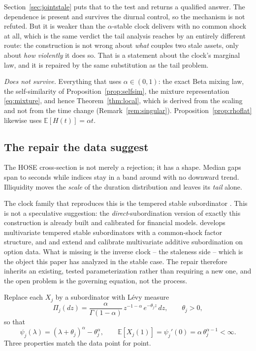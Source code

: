 \documentclass{ws-ijtaf}
\newcommand{\E}{\mathbb{E}}
\begin{document}
Section~\ref{sec:jointstale} puts that to the test and returns a qualified
answer. The dependence is present and survives the diurnal control, so the
mechanism is not refuted. But it is weaker than the $\alpha$-stable clock
delivers with no common shock at all, which is the same verdict the tail
analysis reaches by an entirely different route: the construction is not wrong
about \emph{what} couples two stale assets, only about \emph{how violently} it
does so. That is a statement about the clock's marginal law, and it is repaired
by the same substitution as the tail problem.

\emph{Does not survive.} Everything that uses $\alpha\in(0,1)$: the exact Beta
mixing law, the self-similarity of Proposition~\ref{prop:selfsim}, the mixture
representation \eqref{eq:mixture}, and hence Theorem~\ref{thm:local}, which is
derived from the scaling and not from the time change
(Remark~\ref{rem:singular}). Proposition~\ref{prop:rhoflat} likewise uses
$\E[H(t)]=\alpha t$.

\subsection{The repair the data suggest}

The HOSE cross-section is not merely a rejection; it has a shape. Median gaps
span \hoseGapLo{} to \hoseGapHi{} seconds while indices stay in a band around
\hoseSecondMed{} with no downward trend. Illiquidity moves the \emph{scale} of
the duration distribution and leaves its \emph{tail} alone.

The clock family that reproduces this is the tempered stable subordinator
\citep{ros07,tor24}. This is not a speculative suggestion: the
\emph{direct}-subordination version of exactly this construction is already
built and calibrated for financial models. \citet{sem22} develops multivariate
tempered stable subordinators with a common-shock factor structure, and
\citet{ami25a} and \citet{ami25b} extend and calibrate multivariate additive
subordination on option data. What is missing is the inverse clock -- the
staleness side -- which is the object this paper has analyzed in the stable
case. The repair therefore inherits an existing, tested parameterization rather
than requiring a new one, and the open problem is the governing equation, not
the process.

Replace each $X_j$ by a subordinator with L\'evy measure
\begin{equation}
\Pi_j(dz) = \frac{\alpha}{\Gamma(1-\alpha)}\,z^{-1-\alpha}\,e^{-\theta_j z}\,dz,
\qquad \theta_j>0,
\end{equation}
so that
\begin{equation}
\psi_j(\lambda) = (\lambda+\theta_j)^{\alpha} - \theta_j^{\alpha},
\qquad
\E[X_j(1)] = \psi_j'(0) = \alpha\,\theta_j^{\alpha-1} < \infty .
\label{eq:tempered}
\end{equation}
Three properties match the data point for point.
\end{document}
